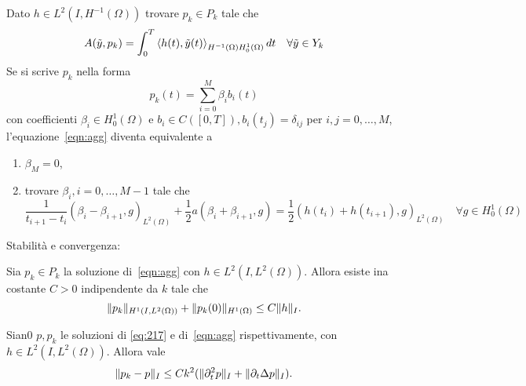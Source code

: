 Dato $h\in L^2(I,H^{-1}(\Omega))$ trovare $p_k\in P_k$ tale che 
\begin{equation}
\label{eqn:agg}
A(\tilde{y},p_k)=\int^T_0 \Braket{h(t),\tilde{y}(t)}_{H^{-1}(\Omega)H^1_0(\Omega)}dt\quad\forall\tilde{y}\in Y_k
\end{equation}
Se si scrive $p_k$ nella forma 
\[
p_k(t)=\sum^M_{i=0}\beta_i b_i(t)
\]
con coefficienti $\beta_i\in H^1_0(\Omega)$ e $b_i\in C([0,T]), b_i(t_j)=\delta_{ij}$ per $i,j=0,\dots,M$, l'equazione~\eqref{eqn:agg} diventa equivalente a
\begin{enumerate}
\item $\beta_M=0$,
\item trovare $\beta_i,i=0,\dots,M-1$ tale che
\begin{equation}
\label{eqn:agg1}
\frac{1}{t_{i+1}-t_i}(\beta_i-\beta_{i+1},g)_{L^2(\Omega)} + \frac{1}{2}a(\beta_i+\beta_{i+1},g)=\frac{1}{2}(h(t_i)+h(t_{i+1}),g)_{L^2(\Omega)}\quad\forall g\in H^1_0(\Omega)
\end{equation}
\end{enumerate}
Stabilità e convergenza:
\begin{lemma}
\label{stab:agg}
Sia $p_k\in P_k$ la soluzione di~\eqref{eqn:agg} con $h\in L^2(I,L^2(\Omega))$. Allora esiste ina costante $C>0$ indipendente da $k$ tale che
\[
\lVert p_k\rVert_{H^1(I,L^2(\Omega))} + \lVert p_k(0)\rVert_{H^1(\Omega)} \le C\lVert h\rVert_I.
\]
\end{lemma}
\begin{lemma}
\label{conv:agg}
Sian0 $p,p_k$ le soluzioni di \ref{eq:217} e di~\eqref{eqn:agg} rispettivamente, con $h\in L^2(I,L^2(\Omega))$. Allora vale
\[
\lVert p_k-p\rVert_I\le Ck^2(\lVert\partial^2_t p\rVert_I + \lVert\partial_t\Delta p\rVert_I).
\]
\end{lemma}